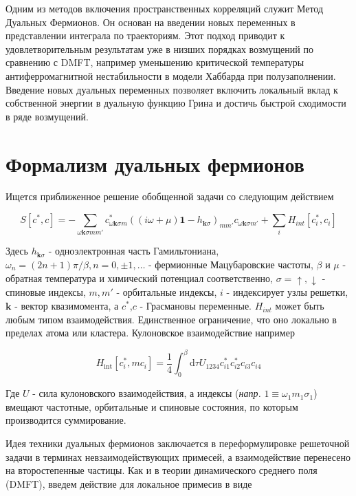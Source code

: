 \documentclass[11pt,a4paper]{report}
\begin{document}
Одним из методов включения пространственных корреляций служит Метод Дуальных Фермионов\cite{PhysRevB.77.033101}. Он основан на введении новых переменных в представлении интеграла по траекториям.
Этот подход приводит к удовлетворительным результатам уже в низших порядках возмущений по сравнению с DMFT, например уменьшению критической температуры антиферромагнитной нестабильности в модели Хаббарда 
при полузаполнении\cite{PhysRevB.77.195105}. Введение новых дуальных переменных позволяет включить локальный вклад к собственной энергии в дуальную функцию Грина и достичь быстрой сходимости в ряде возмущений.


\section{Формализм дуальных фермионов}
Ищется приближенное решение обобщенной задачи со следующим действием

\begin{equation}
\label{action}
 S\left[c^*,c\right] = - \sum_{\omega\mathbf{k}\sigma m m'} c^*_{\omega\mathbf{k}\sigma m} ((i\omega+\mu)\mathbf{1}-h_{\mathbf{k}\sigma})_{m m'}c_{\omega\mathbf{k}\sigma m'} + \sum_i H_{int}[c_i^*,c_i]
\end{equation}

Здесь $h_{\mathbf{k}\sigma}$ - одноэлектронная часть Гамильтониана, $\omega_n=(2n+1)\pi/\beta,n = 0,\pm 1,\dots$ - фермионные Мацубаровские частоты, 
$\beta$ и $\mu$ - обратная температура и химический потенциал соответственно, $\sigma=\uparrow,\downarrow$ - спиновые индексы,
$m,m'$ - орбитальные индексы, $i$ - индексирует узлы решетки, $\mathbf{k}$ - вектор квазимомента, а $c^*$,$c$ - Грасмановы переменные. 
$H_{int}$ может быть любым типом взаимодействия. Единственное ограничение, что оно локально в пределах атома или кластера. Кулоновское взаимодействие например

\begin{equation}
 H_{\text{int}}[c^*_i,mc_i] = \frac{1}{4} \int_0^\beta \mathrm{d}\tau U_{1234} c_{i1}^* c_{i2}^* c_{i3} c_{i4}
\end{equation}

Где $U$ - сила кулоновского взаимодействия, а индексы (\textit{напр.} $1\equiv{\omega_1 m_1\sigma_1}$) вмещают частотные, орбитальные и спиновые состояния, по которым производится суммирование.

Идея техники дуальных фермионов заключается в переформулировке решеточной задачи в терминах невзаимодействующих примесей, а взаимодействие перенесено на второстепенные частицы.
Как и в теории динамического среднего поля (DMFT), введем действие для локальное примесив в виде
\end{document}
